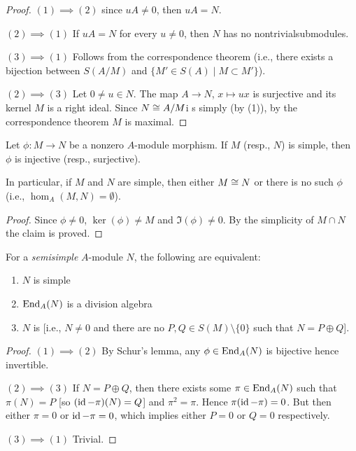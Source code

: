 \begin{proof}
$(1)\implies(2)$ since $uA\neq0$, then $uA=N$.

$(2)\implies(1)$ If $uA=N$ for every $u\neq0$, then $N$ has no
nontrivialsubmodules.

$(3)\implies(1)$ Follows from the correspondence theorem (i.e., there
exists a bijection between $S(A/M)$ and $\{M'\in S(A)\mid M\subset M'\}$).

$(2)\implies(3)$ Let $0\neq u\in N$. The map $A\to N$, $x\mapsto ux$
is surjective and its kernel $M$ is a right ideal. Since $N\cong A/M$i
s simply (by (1)), by the correspondence theorem $M$ is maximal.
\end{proof}

\begin{lemma}\label{lemma:2.11}
Let $\phi\colon M\to N$ be a nonzero $A$-module morphism. If $M$
(resp., $N$) is simple, then $\phi$ is injective (resp., surjective).

In particular, if $M$ and $N$ are simple, then either $M\cong N$ or
there is no such $\phi$ (i.e., $\hom_{A}(M,N)=\emptyset$).
\end{lemma}

\begin{proof}
Since $\phi\neq0$, $\ker(\phi)\neq M$ and $\Im(\phi)\neq0$. By the
simplicity of $M\cap N$ the claim is proved.
\end{proof}

\begin{corollary}\label{cor:2.12}
For a \emph{semisimple} $A$-module $N$, the following are equivalent:
\begin{enumerate}
\item $N$ is simple
\item $\operatorname{End}_{A}(N)$ is a division algebra
\item $N$ is  [i.e., $N\neq0$ and there are no
  $P,Q\in S(M)\setminus\{0\}$ such that $N=P\oplus Q$].
\end{enumerate}
\end{corollary}

\begin{proof}
$(1)\implies(2)$ By Schur's lemma, any $\phi\in\operatorname{End}_{A}(N)$ is
  bijective hence invertible.

$(2)\implies(3)$ If $N=P\oplus Q$, then there exists some $\pi\in\operatorname{End}_{A}(N)$
such that $\pi(N)=P$ [so $(\operatorname{id}-\pi)(N)=Q$] and $\pi^{2}=\pi$. Hence
$\pi(\operatorname{id}-\pi)=0$. But then either $\pi=0$ or $\operatorname{id}-\pi=0$, which
implies either $P=0$ or $Q=0$ respectively.

$(3)\implies(1)$ Trivial.
\end{proof}